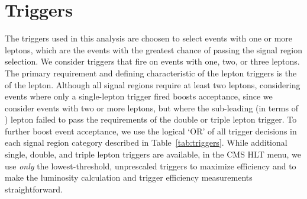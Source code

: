 \begin{landscape}
\end{landscape}


\section{Triggers}
The triggers used in this analysis are choosen to select events with one or more leptons, which are the events with the greatest
chance of passing the signal region selection. We consider triggers that fire on events with one, two, or three leptons. The primary
requirement and defining characteristic of the lepton triggers is the \pt of the lepton.
Although all signal regions require at least two leptons, considering events where only a single-lepton trigger fired boosts acceptance, since
we consider events with two or more leptons, but where the sub-leading (in terms of \pt) lepton failed to pass the requirements of the
double or triple lepton trigger. To further boost event acceptance, we use the logical `OR' of all trigger decisions in each signal
region category described in Table~\ref{tab:triggers}. While additional single, double, and triple lepton triggers are available,
in the CMS HLT menu, we use \emph{only} the lowest-threshold, unprescaled triggers to maximize efficiency and to make the luminosity
calculation and trigger efficiency measurements straightforward. 

